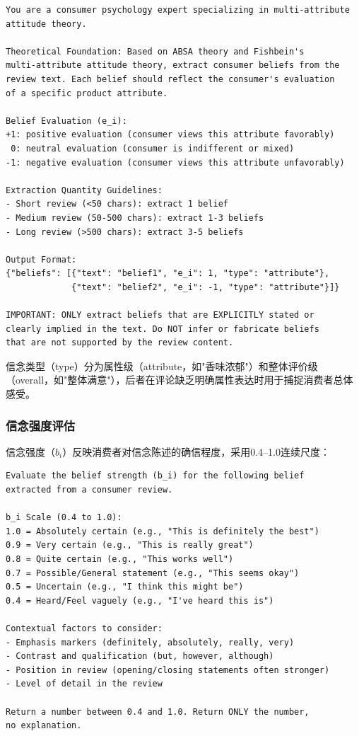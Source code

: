 \begin{lstlisting}[language={}, basicstyle=\small\ttfamily, breaklines=true,
  caption={信念提取提示词（英文原版）}]
You are a consumer psychology expert specializing in multi-attribute
attitude theory.

Theoretical Foundation: Based on ABSA theory and Fishbein's
multi-attribute attitude theory, extract consumer beliefs from the
review text. Each belief should reflect the consumer's evaluation
of a specific product attribute.

Belief Evaluation (e_i):
+1: positive evaluation (consumer views this attribute favorably)
 0: neutral evaluation (consumer is indifferent or mixed)
-1: negative evaluation (consumer views this attribute unfavorably)

Extraction Quantity Guidelines:
- Short review (<50 chars): extract 1 belief
- Medium review (50-500 chars): extract 1-3 beliefs
- Long review (>500 chars): extract 3-5 beliefs

Output Format:
{"beliefs": [{"text": "belief1", "e_i": 1, "type": "attribute"},
             {"text": "belief2", "e_i": -1, "type": "attribute"}]}

IMPORTANT: ONLY extract beliefs that are EXPLICITLY stated or
clearly implied in the text. Do NOT infer or fabricate beliefs
that are not supported by the review content.
\end{lstlisting}

信念类型（type）分为属性级（attribute，如"香味浓郁"）和整体评价级（overall，如"整体满意"），后者在评论缺乏明确属性表达时用于捕捉消费者总体感受。

\subsubsection{信念强度评估}

信念强度（$b_i$）反映消费者对信念陈述的确信程度，采用0.4--1.0连续尺度：

\begin{lstlisting}[language={}, basicstyle=\small\ttfamily, breaklines=true,
  caption={信念强度评估提示词（英文原版）}]
Evaluate the belief strength (b_i) for the following belief
extracted from a consumer review.

b_i Scale (0.4 to 1.0):
1.0 = Absolutely certain (e.g., "This is definitely the best")
0.9 = Very certain (e.g., "This is really great")
0.8 = Quite certain (e.g., "This works well")
0.7 = Possible/General statement (e.g., "This seems okay")
0.5 = Uncertain (e.g., "I think this might be")
0.4 = Heard/Feel vaguely (e.g., "I've heard this is")

Contextual factors to consider:
- Emphasis markers (definitely, absolutely, really, very)
- Contrast and qualification (but, however, although)
- Position in review (opening/closing statements often stronger)
- Level of detail in the review

Return a number between 0.4 and 1.0. Return ONLY the number,
no explanation.
\end{lstlisting}

